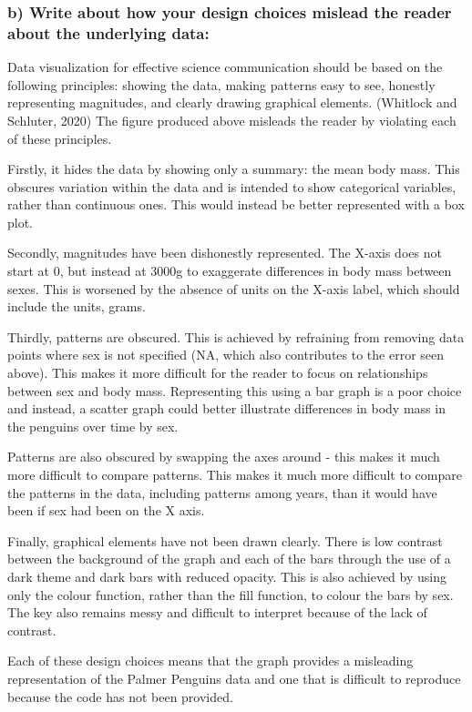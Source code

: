 \documentclass[
]{article}
\begin{document}
\subsubsection{b) Write about how your design choices mislead the reader
about the underlying
data:}\label{b-write-about-how-your-design-choices-mislead-the-reader-about-the-underlying-data}

Data visualization for effective science communication should be based
on the following principles: showing the data, making patterns easy to
see, honestly representing magnitudes, and clearly drawing graphical
elements. (Whitlock and Schluter, 2020) The figure produced above
misleads the reader by violating each of these principles.

Firstly, it hides the data by showing only a summary: the mean body
mass. This obscures variation within the data and is intended to show
categorical variables, rather than continuous ones. This would instead
be better represented with a box plot.

Secondly, magnitudes have been dishonestly represented. The X-axis does
not start at 0, but instead at 3000g to exaggerate differences in body
mass between sexes. This is worsened by the absence of units on the
X-axis label, which should include the units, grams.

Thirdly, patterns are obscured. This is achieved by refraining from
removing data points where sex is not specified (NA, which also
contributes to the error seen above). This makes it more difficult for
the reader to focus on relationships between sex and body mass.
Representing this using a bar graph is a poor choice and instead, a
scatter graph could better illustrate differences in body mass in the
penguins over time by sex.

Patterns are also obscured by swapping the axes around - this makes it
much more difficult to compare patterns. This makes it much more
difficult to compare the patterns in the data, including patterns among
years, than it would have been if sex had been on the X axis.

Finally, graphical elements have not been drawn clearly. There is low
contrast between the background of the graph and each of the bars
through the use of a dark theme and dark bars with reduced opacity. This
is also achieved by using only the colour function, rather than the fill
function, to colour the bars by sex. The key also remains messy and
difficult to interpret because of the lack of contrast.

Each of these design choices means that the graph provides a misleading
representation of the Palmer Penguins data and one that is difficult to
reproduce because the code has not been provided.
\end{document}
